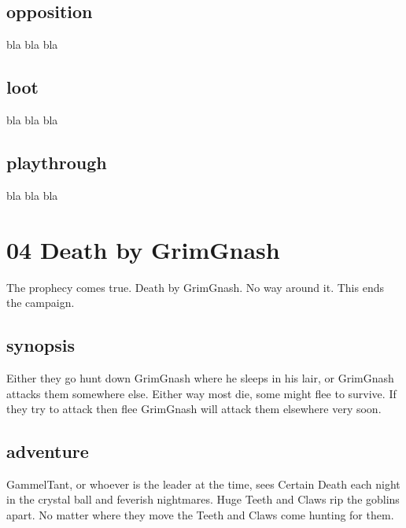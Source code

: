 \subsection*{opposition}

bla bla bla


\subsection*{loot}

bla bla bla


\subsection*{playthrough}

bla bla bla










\newpage
\section*{04 Death by GrimGnash}


The prophecy comes true. Death by GrimGnash. No way around it. This ends the campaign.


\subsection*{synopsis}

Either they go hunt down GrimGnash where he sleeps in his lair, or GrimGnash attacks them somewhere else. Either way most die, some might flee to survive. If they try to attack then flee GrimGnash will attack them elsewhere very soon.


\subsection*{adventure}

GammelTant, or whoever is the leader at the time, sees Certain Death each night in the crystal ball and feverish nightmares. Huge Teeth and Claws rip the goblins apart. No matter where they move the Teeth and Claws come hunting for them.

